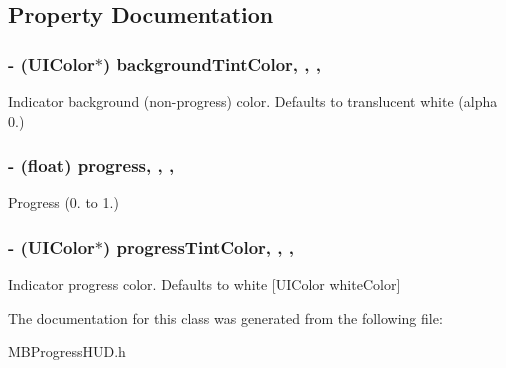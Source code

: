 \subsection{Property Documentation}
\hypertarget{interface_m_b_round_progress_view_ab111d2fa027158e7c21ad411767d193a}{
\subsubsection[{background\+Tint\+Color}]{\setlength{\rightskip}{0pt plus 5cm}-\/ (U\+I\+Color$\ast$) background\+Tint\+Color\hspace{0.3cm}{\ttfamily [read]}, {\ttfamily [write]}, {\ttfamily [nonatomic]}, {\ttfamily [assign]}}}\label{interface_m_b_round_progress_view_ab111d2fa027158e7c21ad411767d193a}
Indicator background (non-\/progress) color. Defaults to translucent white (alpha 0.) \hypertarget{interface_m_b_round_progress_view_af92eeb35944c81f406571bc353dc5d5a}{
\subsubsection[{progress}]{\setlength{\rightskip}{0pt plus 5cm}-\/ (float) progress\hspace{0.3cm}{\ttfamily [read]}, {\ttfamily [write]}, {\ttfamily [nonatomic]}, {\ttfamily [assign]}}}\label{interface_m_b_round_progress_view_af92eeb35944c81f406571bc353dc5d5a}
Progress (0. to 1.) \hypertarget{interface_m_b_round_progress_view_ae5c8d76a85810a3f843f262bdfff1163}{
\subsubsection[{progress\+Tint\+Color}]{\setlength{\rightskip}{0pt plus 5cm}-\/ (U\+I\+Color$\ast$) progress\+Tint\+Color\hspace{0.3cm}{\ttfamily [read]}, {\ttfamily [write]}, {\ttfamily [nonatomic]}, {\ttfamily [assign]}}}\label{interface_m_b_round_progress_view_ae5c8d76a85810a3f843f262bdfff1163}
Indicator progress color. Defaults to white \mbox{[}U\+I\+Color white\+Color\mbox{]} 

The documentation for this class was generated from the following file\+:\begin{DoxyCompactItemize}
\item 
M\+B\+Progress\+H\+U\+D.\+h\end{DoxyCompactItemize}
